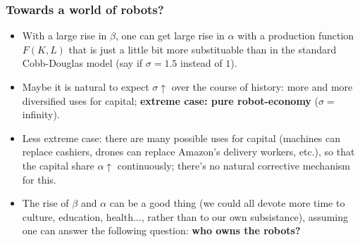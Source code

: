 \documentclass[t]{beamer}\usepackage[]{graphicx}\usepackage[]{color}
\begin{document}
\begin{frame}[label=Robots]
\frametitle{Towards a world of robots?}
\begin{itemize}
\item
With a large rise in $\beta$, one can get large rise in $\alpha$ with a production function $F(K,L)$ that is just a little bit more substituable than in the standard Cobb-Douglas model (say if $\sigma = 1.5$ instead of $1$).
\item
Maybe it is natural to expect $\sigma \uparrow$ over the course of history: more and more diversified uses for capital;
\textbf{extreme case: pure robot-economy} ($\sigma = $ infinity).
\item
Less extreme case: there are many possible uses for capital (machines can replace cashiers, drones can replace Amazon's delivery workers, etc.), so that the capital share $\alpha \uparrow$ continuously; there's no natural corrective mechanism for this.
\item
The rise of $\beta$ and $\alpha$ can be a good thing (we could all devote more time to culture, education, health..., rather than to our own subsistance), assuming one can answer the following question: \textbf{who owns the robots?}
\end{itemize}
\end{frame}
\end{document}

